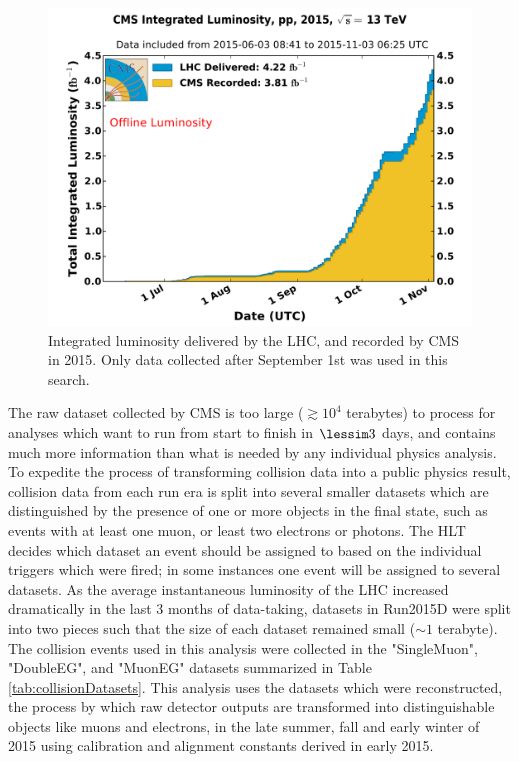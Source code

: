 \begin{figure}[h]
	\centering
	\includegraphics[width=1.0\textwidth]{figures/int_lumi_per_day_cumulative_pp_2015.pdf}
	\caption{Integrated luminosity delivered by the LHC, and recorded by CMS in 2015.  Only data collected after 
	September 1st was used in this search.}
	\label{fig:lhc2015IntegLumi}
\end{figure}


The raw dataset collected by CMS is too large ($\gtrsim 10^{4}$ terabytes) to process for analyses
which want to run from start to finish in $\lessim 3$ days, and contains much more information
than what is needed by any individual physics analysis.  To expedite the process of
transforming collision data into a public physics result, collision data from each run
era is split into several smaller datasets which are distinguished by the presence of one
or more objects in the final state, such as events with at least one muon, or least two
electrons or photons.  The HLT decides which dataset an event should be assigned to based on the
individual triggers which were fired; in some instances one event will be assigned to several
datasets.  As the average instantaneous luminosity of the LHC increased dramatically in the 
last 3 months of data-taking, datasets in Run2015D were split into two pieces such that the size
of each dataset remained small ($\sim 1$ terabyte).  The collision events used in this analysis
were collected in the "SingleMuon", "DoubleEG", and "MuonEG" datasets summarized in Table
\ref{tab:collisionDatasets}.  This analysis uses the datasets which were reconstructed, the process
by which raw detector outputs are transformed into distinguishable objects like muons and
electrons, in the late summer, fall and early winter of 2015 using calibration and alignment
constants derived in early 2015.

